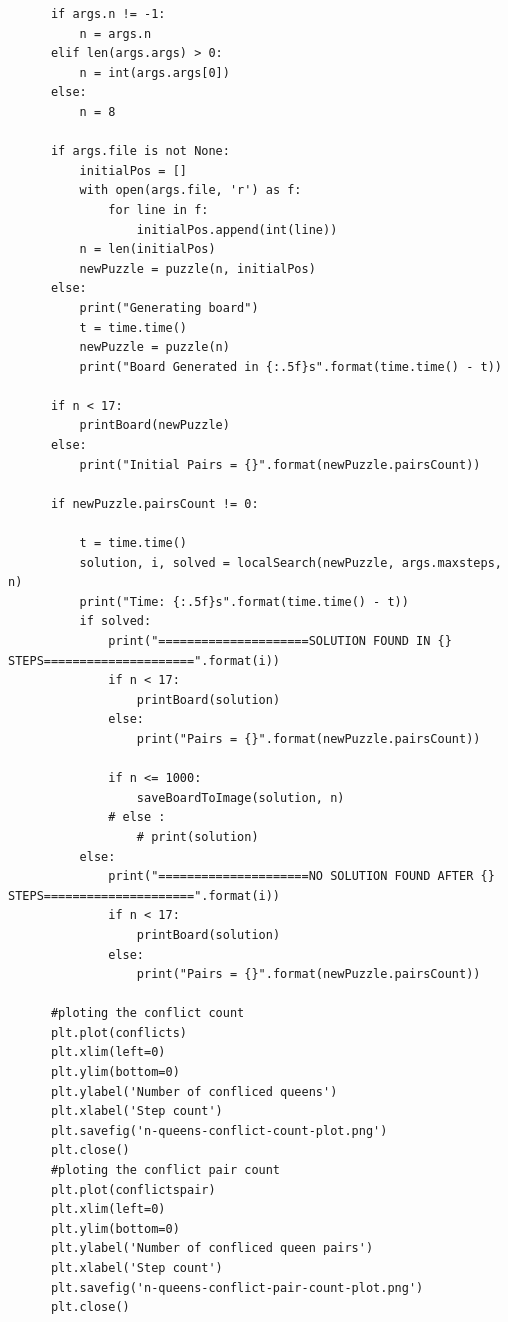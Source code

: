 \documentclass{article}
\begin{document}
\begin{verbatim}
      if args.n != -1:
          n = args.n
      elif len(args.args) > 0:
          n = int(args.args[0])
      else:
          n = 8
  
      if args.file is not None:
          initialPos = []
          with open(args.file, 'r') as f:
              for line in f:
                  initialPos.append(int(line))
          n = len(initialPos)
          newPuzzle = puzzle(n, initialPos)
      else:
          print("Generating board")
          t = time.time()
          newPuzzle = puzzle(n)
          print("Board Generated in {:.5f}s".format(time.time() - t))
  
      if n < 17:
          printBoard(newPuzzle)
      else:
          print("Initial Pairs = {}".format(newPuzzle.pairsCount))
  
      if newPuzzle.pairsCount != 0:
  
          t = time.time()
          solution, i, solved = localSearch(newPuzzle, args.maxsteps, n)
          print("Time: {:.5f}s".format(time.time() - t))
          if solved: 
              print("=====================SOLUTION FOUND IN {} STEPS=====================".format(i))
              if n < 17:
                  printBoard(solution)
              else:
                  print("Pairs = {}".format(newPuzzle.pairsCount))

              if n <= 1000:
                  saveBoardToImage(solution, n)
              # else : 
                  # print(solution)
          else: 
              print("=====================NO SOLUTION FOUND AFTER {} STEPS=====================".format(i))
              if n < 17:
                  printBoard(solution)
              else:
                  print("Pairs = {}".format(newPuzzle.pairsCount))
  
      #ploting the conflict count
      plt.plot(conflicts)
      plt.xlim(left=0)        
      plt.ylim(bottom=0)
      plt.ylabel('Number of confliced queens')
      plt.xlabel('Step count')
      plt.savefig('n-queens-conflict-count-plot.png')
      plt.close()
      #ploting the conflict pair count
      plt.plot(conflictspair)
      plt.xlim(left=0)        
      plt.ylim(bottom=0)
      plt.ylabel('Number of confliced queen pairs')
      plt.xlabel('Step count')
      plt.savefig('n-queens-conflict-pair-count-plot.png')
      plt.close()
\end{verbatim}
\end{document}
